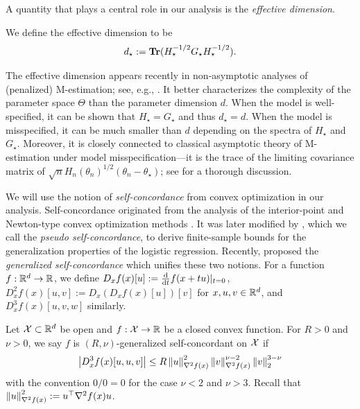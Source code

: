 A quantity that plays a central role in our analysis is the \emph{effective dimension}.
\begin{definition}
\label{def:effective_dim}
    We define the effective dimension to be
    \begin{align}
        d_\star := \operatorname{\bf Tr}( H_\star^{-1/2} G_\star H_\star^{-1/2} ).
    \end{align}
\end{definition}
The effective dimension appears recently in non-asymptotic analyses of (penalized) M-estimation; see, e.g., \citep{spokoiny2017penalized,ostrovskii2021finite}.
It better characterizes the complexity of the parameter space $\Theta$ than the parameter dimension $d$.
When the model is well-specified, it can be shown that $H_\star = G_\star$ and thus $d_\star = d$.
When the model is misspecified, it can be much smaller than $d$ depending on the spectra of $H_\star$ and $G_\star$.
Moreover, it is closely connected to classical asymptotic theory of M-estimation under model misspecification---it is the trace of the limiting covariance matrix of $\sqrt{n}H_n(\theta_n)^{1/2}(\theta_n - \theta_\star)$;
see  for a thorough discussion.

We will use the notion of \emph{self-concordance} from convex optimization in our analysis.
Self-concordance originated from the analysis of the interior-point and Newton-type convex optimization methods \citep{yurii1994interior}.
It was later modified by \citet{bach2010self}, which we call the \emph{pseudo self-concordance}, to derive finite-sample bounds for the generalization properties of the logistic regression.
Recently, \citet{sun2019generalized} proposed the \emph{generalized self-concordance} which unifies these two notions.
For a function $f: {\mathbb R}^d \to {\mathbb R}$, we define $D_x f(x)[u] := \frac{\mathrm{d}}{\mathrm{d} t} f(x + tu) |_{t = 0}$, $D_x^2 f(x)[u, v] := D_x (D_x f(x)[u])[v]$ for $x, u, v \in {\mathbb R}^d$, and $D_x^3 f(x)[u, v, w]$ similarly.
\begin{definition}
\label{def:general_self_concordance}
    Let $\mathcal{X} \subset {\mathbb R}^d$ be open and $f: \mathcal{X} \rightarrow {\mathbb R}$ be a closed convex function.
    For $R > 0$ and $\nu > 0$, we say $f$ is $(R, \nu)$-generalized self-concordant on $\mathcal{X}$ if
    \begin{align*}
        \left| D_x^3 f(x) [u, u, v] \right| \le R \left\lVert u \right\rVert_{\nabla^2 f(x)}^2 \left\lVert v \right\rVert_{\nabla^2 f(x)}^{\nu-2} \left\lVert v \right\rVert_2^{3-\nu}
    \end{align*}
    with the convention $0/0 = 0$ for the case $\nu < 2$ and $\nu > 3$.
    Recall that $\left\lVert u \right\rVert_{\nabla^2 f(x)}^2 := u^\top \nabla^2 f(x) u$.
\end{definition}

